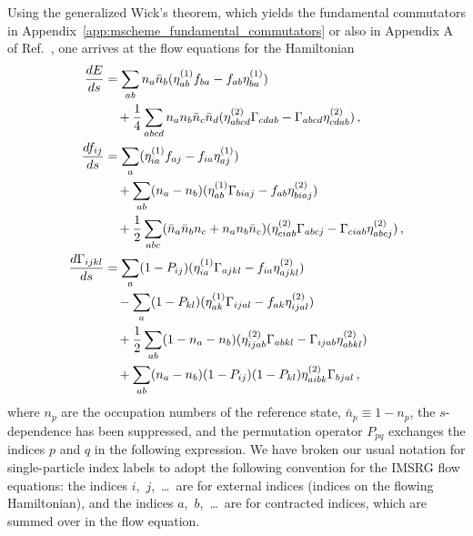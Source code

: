 Using the generalized Wick's theorem,
which yields the fundamental commutators in Appendix~\ref{app:mscheme_fundamental_commutators}
or also in Appendix A of Ref.~\cite{Herg15imsrgphysrep},
one arrives at the flow equations for the Hamiltonian
\begin{align}
  \phantom{\frac{d\Gamma_{ijkl}}{ds}}
   & \begin{aligned}
    \mathllap{\frac{dE}{ds}} & = \sum_{ab} n_{a} \bar{n}_{b}
    (\genone_{ab} f_{ba} - f_{ab} \genone_{ba})                                              \\
                             & \quad + \frac{1}{4} \sum_{abcd} n_{a}n_{b}\bar{n}_c \bar{n}_d
    (\gentwo_{abcd} \Gamma_{cdab} - \Gamma_{abcd}\gentwo_{cdab})\,,
  \end{aligned}\label{eq:imsrg2_0body} \\
   & \begin{aligned}
    \mathllap{\frac{df_{ij}}{ds}} & =
    \sum_{a}(\genone_{ia} f_{aj} - f_{ia} \genone_{aj})                                                          \\
                                  & \quad+\sum_{ab}(n_a - n_b)(\genone_{ab}\Gamma_{biaj} - f_{ab}\gentwo_{biaj}) \\
                                  & \quad+\frac{1}{2}\sum_{abc}(\bar{n}_a \bar{n}_b n_c + n_a n_b \bar{n}_c)
    (\gentwo_{ciab} \Gamma_{abcj} - \Gamma_{ciab} \gentwo_{abcj})\,,
  \end{aligned}\label{eq:imsrg2_1body} \\
   & \begin{aligned}
    \mathllap{\frac{d\Gamma_{ijkl}}{ds}} & =
    \sum_{a}(1 - P_{ij})(\genone_{ia}\Gamma_{ajkl} - f_{ia}\gentwo_{ajkl})                                                                            \\
                                         & \quad - \sum_{a}(1 - P_{kl})(\genone_{ak}\Gamma_{ijal} - f_{ak}\gentwo_{ijal})                             \\
                                         & \quad + \frac{1}{2}\sum_{ab}(1 - n_{a} - n_{b})(\gentwo_{ijab}\Gamma_{abkl} - \Gamma_{ijab}\gentwo_{abkl}) \\
                                         & \quad + \sum_{ab} (n_a - n_b)(1 - P_{ij})(1 - P_{kl})\gentwo_{aibk}\Gamma_{bjal}\,,
  \end{aligned}\label{eq:imsrg2_2body}
\end{align}
where $n_p$ are the occupation numbers of the reference state,
$\bar{n}_p \equiv 1 - n_p$,
the $s$-dependence has been suppressed,
and the permutation operator $P_{pq}$ exchanges the indices $p$ and $q$
in the following expression.
We have broken our usual notation for single-particle index labels
to adopt the following convention for the IMSRG flow equations:
the indices $i$,~$j$,~\ldots\ are for external indices
(indices on the flowing Hamiltonian),
and the indices $a$,~$b$,~\ldots\ are for contracted indices,
which are summed over in the flow equation.

